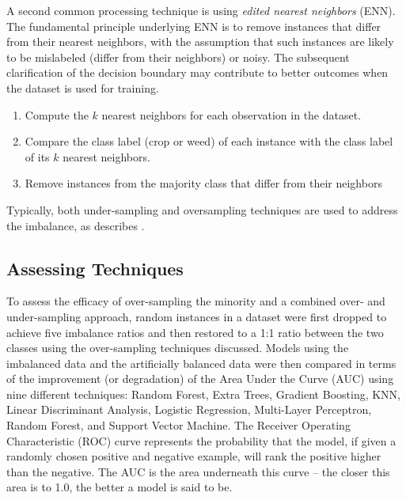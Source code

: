 \documentclass[letterpaper]{article}
\begin{document}
{\begin{figure}[H]
	\label{fig:tomek}
\end{figure}
A second common processing technique is using \textit{edited nearest neighbors} (ENN). The fundamental principle underlying ENN is to remove instances that differ from their nearest neighbors, with the assumption that such instances are likely to be mislabeled (differ from their neighbors) or noisy. The subsequent clarification of the decision boundary may contribute to better outcomes when the dataset is used for training.
\begin{enumerate}
\item{Compute the $k$ nearest neighbors for each observation in the dataset.}
\item{Compare the class label (crop or weed) of each instance with the class label of its $k$ nearest neighbors.}
\item{Remove instances from the majority class that differ from their neighbors}
\end{enumerate}

Typically, both under-sampling and oversampling techniques are used to address the imbalance, as \citeauthor{Batista2004-qz} describes \cite{Batista2004-qz}. 

\subsection{Assessing Techniques}
To assess the efficacy of over-sampling the minority and a combined over- and under-sampling approach, random instances in a dataset were first dropped to achieve five imbalance ratios and then restored to a 1:1 ratio between the two classes using the over-sampling techniques discussed. Models using the imbalanced data and the artificially balanced data were then compared in terms of the improvement (or degradation) of the Area Under the Curve (AUC) using nine different techniques: Random Forest, Extra Trees, Gradient Boosting, KNN, Linear Discriminant Analysis, Logistic Regression, Multi-Layer Perceptron, Random Forest, and Support Vector Machine. The Receiver Operating Characteristic (ROC) curve represents the probability that the model, if given a randomly chosen positive and negative example, will rank the positive higher than the negative. The AUC is the area underneath this curve -- the closer this area is to 1.0, the better a model is said to be.

}
\end{document}
